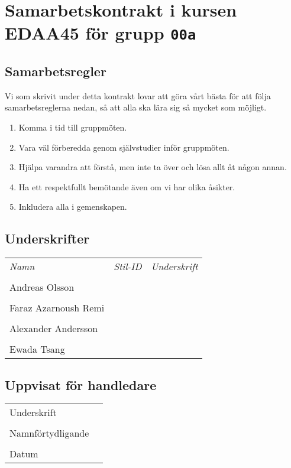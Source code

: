 \documentclass[12pt]{article}
\begin{document}
\clearpage\thispagestyle{empty}

\section*{Samarbetskontrakt i kursen EDAA45 för grupp \texttt{00a}}
\subsection*{Samarbetsregler}
Vi som skrivit under detta kontrakt lovar att göra vårt bästa för att följa samarbetsreglerna nedan, så att alla ska lära sig så mycket som möjligt. 
\begin{enumerate}
\item Komma i tid till gruppmöten.
\item Vara väl förberedda genom självstudier inför gruppmöten.
\item Hjälpa varandra att förstå, men inte ta över och lösa allt åt någon annan.
\item Ha ett respektfullt bemötande även om vi har olika åsikter.
\item Inkludera alla i gemenskapen.
\end{enumerate}

\subsection*{Underskrifter}
\vspace{1em}

\begin{tabular}{l l p{7cm}}
\emph{Namn} & \emph{Stil-ID} & \emph{Underskrift} \\
\\ Andreas Olsson &  & \dotfill \\
\\ Faraz Azarnoush Remi &  & \dotfill \\
\\ Alexander Andersson &  & \dotfill \\
\\  Ewada Tsang &  & \dotfill \\

\end{tabular}

\vspace{1em }
\subsection*{Uppvisat för handledare}

\begin{tabular}{l p{8cm}}
\\ Underskrift &  \dotfill \\
\\ Namnförtydligande &  \dotfill \\
\\ Datum & \dotfill \\
\end{tabular}
\end{document}
